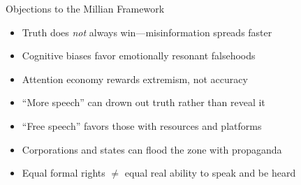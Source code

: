 ﻿\documentclass[aspectratio=169,11pt]{beamer}
\begin{document}
\begin{frame}{Objections to the Millian Framework}
\begin{objectionbox}
\begin{itemize}
    \item Truth does \textit{not} always win---misinformation spreads faster
    \item Cognitive biases favor emotionally resonant falsehoods
    \item Attention economy rewards extremism, not accuracy
    \item ``More speech'' can drown out truth rather than reveal it
\end{itemize}
\end{objectionbox}

\vspace{0.3cm}
\begin{objectionbox}
\begin{itemize}
    \item ``Free speech'' favors those with resources and platforms
    \item Corporations and states can flood the zone with propaganda
    \item Equal formal rights $\neq$ equal real ability to speak and be heard
\end{itemize}
\end{objectionbox}
\end{frame}
\end{document}
